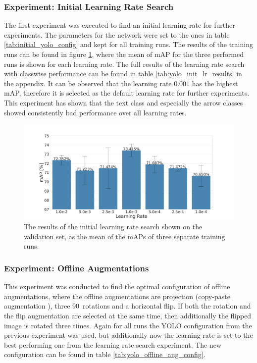 \subsubsection{Experiment: Initial Learning Rate Search}

The first experiment was executed to find an initial learning rate for further experiments.
The parameters for the network were set to the ones in table \ref{tab:initial_yolo_config} and kept for all training runs.
The results of the training runs can be found in figure \ref{fig:yolo_lr_experiment_results}, where the mean of mAP for the three performed runs is shown for each learning rate.
The full results of the learning rate search with classwise performance can be found in table \ref{tab:yolo_init_lr_results} in the appendix.
It can be observed that the learning rate $0.001$ has the highest \ac{mAP}, therefore it is selected as the default learning rate for further experiments.
This experiment has shown that the text class and especially the arrow classes showed consistently bad performance over all learning rates.

\begin{figure}
\begin{center}
    \includegraphics[width=13cm]{imgs/yolo_lr_experiment.pdf}
    \caption{The results of the initial learning rate search shown on the validation set, as the mean of the mAPs of three separate training runs.}
    \label{fig:yolo_lr_experiment_results}
\end{center}
\end{figure}


\subsubsection{Experiment: Offline Augmentations}

This experiment was conducted to find the optimal configuration of offline augmentations, where the offline augmentations are projection (copy-paste augmentation \cite{copypaste_aug}), three 90\textdegree\ rotations and a horizontal flip.
If both the rotation and the flip augmentation are selected at the same time, then additionally the flipped image is rotated three times.
Again for all runs the YOLO configuration from the previous experiment was used, but additionally now the learning rate is set to the best performing one from the learning rate search experiment.
The new configuration can be found in table \ref{tab:yolo_offline_aug_config}.

